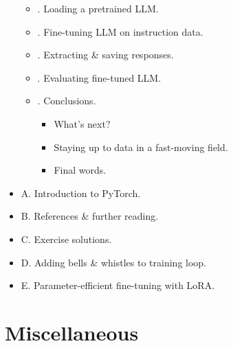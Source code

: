 \documentclass{article}
\begin{document}
\begin{itemize}
\begin{itemize}
		\item {. Loading a pretrained LLM.}
		\item {. Fine-tuning LLM on instruction data.}
		\item {. Extracting \& saving responses.}
		\item {. Evaluating fine-tuned LLM.}
		\item {. Conclusions.}
		\begin{itemize}
			\item {\sf What's next?}
			\item {\sf Staying up to data in a fast-moving field.}
			\item {\sf Final words.}
		\end{itemize}
	\end{itemize}
	\item {\sf A. Introduction to PyTorch.}
	\item {\sf B. References \& further reading.}
	\item {\sf C. Exercise solutions.}
	\item {\sf D. Adding bells \& whistles to training loop.}
	\item {\sf E. Parameter-efficient fine-tuning with LoRA.}
\end{itemize}


\section{Miscellaneous}


\printbibliography[heading=bibintoc]
	
\end{document}
